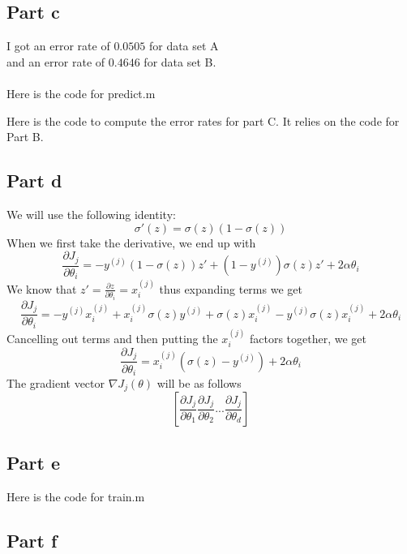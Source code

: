 \documentclass[twoside,11pt]{article}
\theoremstyle{definition}
\begin{document}
\subsection*{Part c}

I got an error rate of $0.0505$ for data set A\\
 and an error rate of $0.4646$ for data set B.\\
\\
Here is the code for predict.m

\newpage
Here is the code to compute the error rates for part C. It relies on the code for Part B.


\subsection*{Part d}

We will use the following identity:
\[
\sigma'(z) = \sigma(z)(1-\sigma(z))
\]
When we first take the derivative, we end up with
\[
\frac{\partial J_j}{\partial \theta_i} = -y^{(j)} (1-\sigma(z)) z' + (1-y^{(j)}) \sigma(z) z' + 2 \alpha \theta_i
\]
We know that $z' = \frac{\partial z}{\partial \theta_i}= x_i^{(j)}$ thus expanding terms we get
\[
\frac{\partial J_j}{\partial \theta_i} = -y^{(j)}x_i^{(j)} + x_i^{(j)}\sigma(z)y^{(j)} + \sigma(z) x_i^{(j)} -y^{(j)} \sigma(z) x_i^{(j)} + 2 \alpha \theta_i
\]
Cancelling out terms and then putting the $x_i^{(j)}$ factors together, we get
\[
\frac{\partial J_j}{\partial \theta_i} = x_i^{(j)} (\sigma(z) - y^{(j)} ) + 2 \alpha \theta_i
\]
The gradient vector $\nabla J_j(\theta)$ will be as follows
\[
[\frac{\partial J_j}{\partial \theta_1} \frac{\partial J_j}{\partial \theta_2} ... \frac{\partial J_j}{\partial \theta_d}]
\]
\newpage
\subsection*{Part e}

Here is the code for train.m


\subsection*{Part f}
\end{document}
